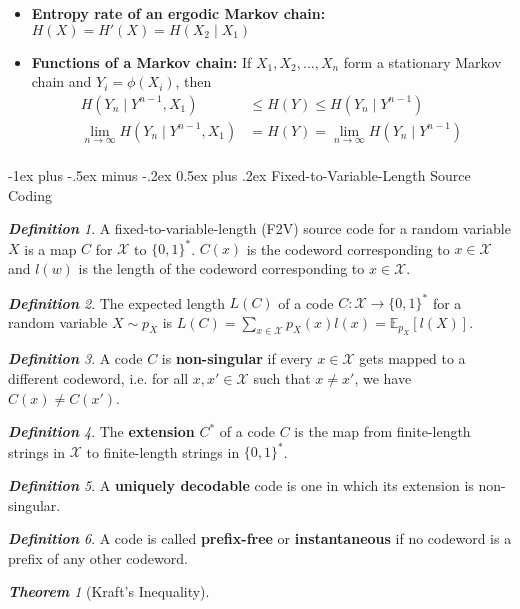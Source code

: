 \documentclass[frenchspacing,9pt,landscape,a4paper]{article}
\makeatletter
\renewcommand{\section}{\@startsection{section}{1}{0mm}%
                                {-1ex plus -.5ex minus -.2ex}%
                                {0.5ex plus .2ex}%
                                {\normalfont\large\bfseries}}
\theoremstyle{remark}
\newtheorem*{thm}{\textbf{Theorem}}
\newtheorem*{defn}{\textbf{Definition}}
\makeatother
\begin{document}
\begin{multicols}{4}
\begin{itemize}
    \item \textbf{Entropy rate of an ergodic Markov chain:} $H(X)=H'(X)=H(X_2\mid X_1)$ 
    \item \textbf{Functions of a Markov chain:} If  $X_1,X_2,\dots,X_n$ form a stationary Markov chain and
        $Y_i=\phi(X_i)$, then
        \begin{align*}
            H(Y_n\mid Y^{n-1},X_1)&\leq H(Y)\leq H(Y_n\mid Y^{n-1})\\
            \lim_{n\to\infty}H(Y_n\mid Y^{n-1},X_1)&=H(Y)=\lim_{n\to\infty}H(Y_n\mid Y^{n-1})\\
        \end{align*}
\end{itemize}
\section{Fixed-to-Variable-Length Source Coding}
\begin{defn}
    A fixed-to-variable-length (F2V) source code for a random variable $X$ is a map  $C$ for  $\mathcal{X}$
    to  $\{0,1\}^*$.  $C(x)$ is the codeword corresponding to  $x\in\mathcal{X}$ and  $l(w)$ is the length
    of the codeword corresponding to  $x\in\mathcal{X}$.
\end{defn}
\begin{defn}
    The expected length $L(C)$ of a code  $C:\mathcal{X}\to\{0,1\}^*$ for a random variable  $X\sim p_X$ is
    $L(C)=\sum_{x\in\mathcal{X}}p_X(x)l(x)=\mathbb{E}_{p_X}[l(X)]$.
\end{defn}
\begin{defn}
    A code $C$ is \textbf{non-singular} if every $x\in\mathcal{X}$ gets mapped to a different codeword,
    i.e. for all  $x,x'\in\mathcal{X}$ such that  $x\neq x'$, we have  $C(x)\neq C(x')$.
\end{defn}
\begin{defn}
    The \textbf{extension} $C^*$ of a code  $C$ is the map from finite-length strings in $\mathcal{X}$ to
    finite-length strings in  $\{0,1\}^*$.
\end{defn}
\begin{defn}
    A \textbf{uniquely decodable} code is one in which its extension is non-singular.
\end{defn}
\begin{defn}
    A code is called \textbf{prefix-free} or \textbf{instantaneous} if no codeword is a prefix of any other
    codeword.
\end{defn}
\begin{thm}[Kraft's Inequality]

\end{thm}
\end{multicols}
\end{document}
